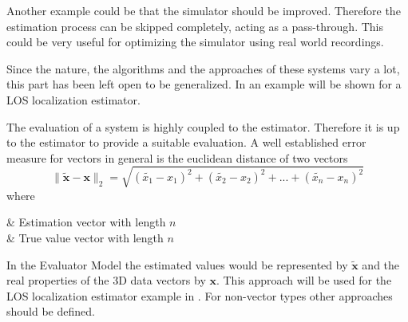 Another example could be that the simulator should be improved.
Therefore the estimation process can be skipped completely, acting as a pass-through.
This could be very useful for optimizing the simulator using real world recordings.

Since the nature, the algorithms and the approaches of these systems vary a lot, this part has been left open to be generalized. In  an example will be shown for a LOS localization estimator.



The evaluation of a system is highly coupled to the estimator.
Therefore it is up to the estimator to provide a suitable evaluation.
A well established error measure for vectors in general is the euclidean distance of two vectors
\begin{equation}
    \lVert \mathbf{\widetilde{x} - \mathbf{x}} \rVert_2 = \sqrt{(\tilde{x_1}-x_1)^2 + (\tilde{x_2}-x_2)^2 + ... + (\tilde{x_n}-x_n)^2}
\end{equation}
where
\begin{conditions}
     & Estimation vector with length $n$ \\
     & True value vector with length $n$ \\
\end{conditions}
In the Evaluator Model the estimated values would be represented by $\mathbf{\widetilde{x}}$ and the real properties of the 3D data vectors by $\mathbf{x}$.
This approach will be used for the LOS localization estimator example in .
For non-vector types other approaches should be defined.


